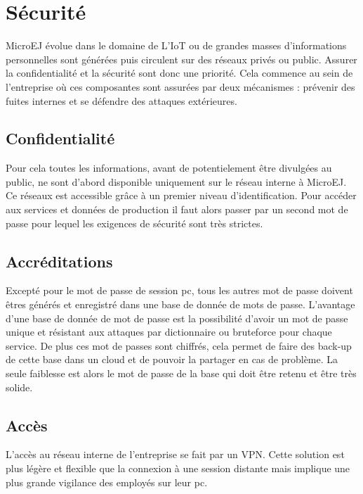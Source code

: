 \documentclass[french,a4paper,12pt]{report}
\begin{document}
\section{Sécurité}

MicroEJ évolue dans le domaine de L'IoT ou de grandes masses d'informations personnelles sont générées puis circulent sur des réseaux privés ou public. Assurer la confidentialité et la sécurité sont donc une priorité. Cela commence au sein de l'entreprise où ces composantes sont assurées par deux mécanismes : prévenir des fuites internes et se défendre des attaques extérieures.

\subsection{Confidentialité}

Pour cela toutes les informations, avant de potentielement être divulgées au public, ne sont d'abord disponible uniquement sur le réseau interne à MicroEJ. Ce réseaux est accessible grâce à un premier niveau d'identification. Pour accéder aux services et données de production il faut alors passer par un second mot de passe pour lequel les exigences de sécurité sont très strictes.


\subsection{Accréditations}

Excepté pour le mot de passe de session pc, tous les autres mot de passe doivent êtres générés et enregistré dans une base de donnée de mots de passe. L’avantage d’une base de donnée de mot de passe est la possibilité d’avoir un mot de passe unique et résistant aux attaques par dictionnaire ou bruteforce pour chaque service. De plus ces mot de passes sont chiffrés, cela permet de faire des back-up de cette base dans un cloud et de pouvoir la partager en cas de problème. La seule faiblesse est alors le mot de passe de la base qui doit être retenu et être très solide.

\subsection{Accès}

L’accès au réseau interne de l’entreprise se fait par un VPN. Cette solution est plus légère et flexible que la connexion à une session distante mais implique une plus grande vigilance des employés sur leur pc. 
\end{document}
